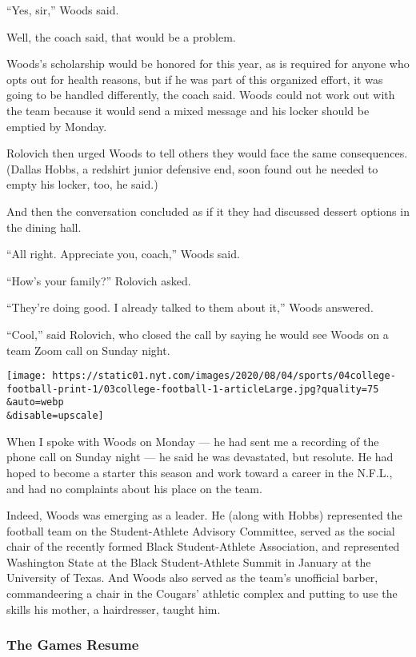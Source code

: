 ``Yes, sir,'' Woods said.

Well, the coach said, that would be a problem.

Woods's scholarship would be honored for this year, as is required for
anyone who opts out for health reasons, but if he was part of this
organized effort, it was going to be handled differently, the coach
said. Woods could not work out with the team because it would send a
mixed message and his locker should be emptied by Monday.

Rolovich then urged Woods to tell others they would face the same
consequences. (Dallas Hobbs, a redshirt junior defensive end, soon found
out he needed to empty his locker, too, he said.)

And then the conversation concluded as if it they had discussed dessert
options in the dining hall.

``All right. Appreciate you, coach,'' Woods said.

``How's your family?'' Rolovich asked.

``They're doing good. I already talked to them about it,'' Woods
answered.

``Cool,'' said Rolovich, who closed the call by saying he would see
Woods on a team Zoom call on Sunday night.

\texttt{[image: https://static01.nyt.com/images/2020/08/04/sports/04college-football-print-1/03college-football-1-articleLarge.jpg?quality=75\\\&auto=webp\\\&disable=upscale]}

When I spoke with Woods on Monday --- he had sent me a recording of the
phone call on Sunday night --- he said he was devastated, but resolute.
He had hoped to become a starter this season and work toward a career in
the N.F.L., and had no complaints about his place on the team.

Indeed, Woods was emerging as a leader. He (along with Hobbs)
represented the football team on the Student-Athlete Advisory Committee,
served as the social chair of the recently formed Black Student-Athlete
Association, and represented Washington State at the Black
Student-Athlete Summit in January at the University of Texas. And Woods
also served as the team's unofficial barber, commandeering a chair in
the Cougars' athletic complex and putting to use the skills his mother,
a hairdresser, taught him.

\hypertarget{the-games-resume}{%
\subsubsection{The Games Resume}\label{the-games-resume}}


